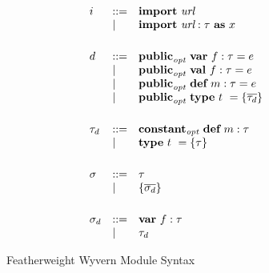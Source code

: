 \begin{figure}
\[\begin{array}{lll}
i   & ::= & \textbf{import}~ \textit{url}\\
	 & \mathrel{\mid} & \textbf{import}~ \textit{url} : \tau ~\textbf{as}~ x\\
\\[1ex]


d   & ::= & \textbf{public}_\textit{opt} ~\textbf{var}~ f:\tau = e \\
     & \mathrel{\mid} & \textbf{public}_\textit{opt} ~\textbf{val}~ f:\tau = e \\
     & \mathrel{\mid} & \textbf{public}_\textit{opt} ~\textbf{def}~ m:\tau = e \\
     & \mathrel{\mid} & \textbf{public}_\textit{opt} ~\textbf{type}~ t~ = \{ \overline{\tau_d} \} \\
\\[1ex]


\tau_d   & ::= & \textbf{constant}_\textit{opt} ~\textbf{def}~ m:\tau \\
         & \mathrel{\mid} & \textbf{type}~ t~ = \{ \tau \}  \\
\\[1ex]

\sigma & ::= & \tau \\
       & \mathrel{\mid} & \{ \overline{\sigma_d} \} \\
\\[1ex]

\sigma_d & ::= & \textbf{var}~ f:\tau \\
         & \mathrel{\mid} & \tau_d \\

\end{array}
\]
\caption{Featherweight Wyvern Module Syntax}
\label{fig:core4-syntax}
\end{figure}
